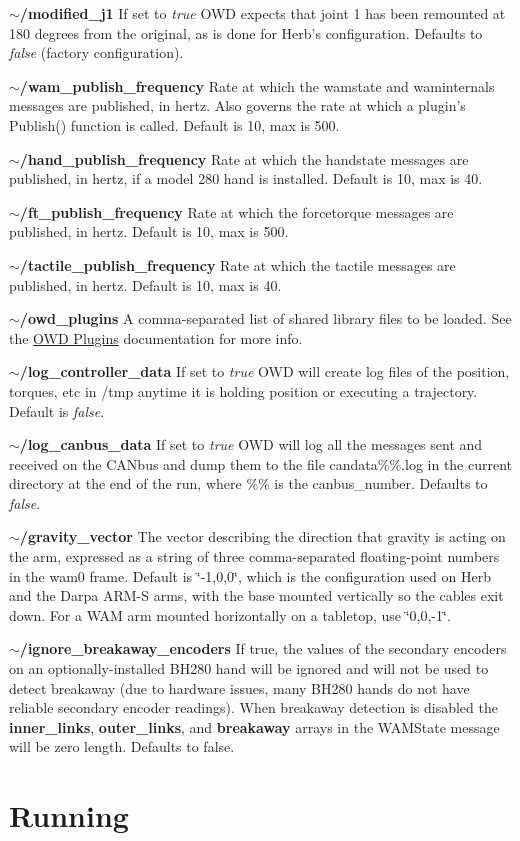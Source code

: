 \begin{DoxyItemize}
\item {\bfseries $\sim$/modified\-\_\-j1} If set to {\itshape true} O\-W\-D expects that joint 1 has been remounted at 180 degrees from the original, as is done for Herb's configuration. Defaults to {\itshape false} (factory configuration).
\item {\bfseries $\sim$/wam\-\_\-publish\-\_\-frequency} Rate at which the wamstate and waminternals messages are published, in hertz. Also governs the rate at which a plugin's Publish() function is called. Default is 10, max is 500.
\item {\bfseries $\sim$/hand\-\_\-publish\-\_\-frequency} Rate at which the handstate messages are published, in hertz, if a model 280 hand is installed. Default is 10, max is 40.
\item {\bfseries $\sim$/ft\-\_\-publish\-\_\-frequency} Rate at which the forcetorque messages are published, in hertz. Default is 10, max is 500.
\item {\bfseries $\sim$/tactile\-\_\-publish\-\_\-frequency} Rate at which the tactile messages are published, in hertz. Default is 10, max is 40.
\item {\bfseries $\sim$/owd\-\_\-plugins} A comma-\/separated list of shared library files to be loaded. See the \hyperlink{plugins}{O\-W\-D Plugins} documentation for more info.
\item {\bfseries $\sim$/log\-\_\-controller\-\_\-data} If set to {\itshape true} O\-W\-D will create log files of the position, torques, etc in /tmp anytime it is holding position or executing a trajectory. Default is {\itshape false}.
\item {\bfseries $\sim$/log\-\_\-canbus\-\_\-data} If set to {\itshape true} O\-W\-D will log all the messages sent and received on the C\-A\-Nbus and dump them to the file candata\%\%.log in the current directory at the end of the run, where \%\% is the canbus\-\_\-number. Defaults to {\itshape false}.
\item {\bfseries $\sim$/gravity\-\_\-vector} The vector describing the direction that gravity is acting on the arm, expressed as a string of three comma-\/separated floating-\/point numbers in the wam0 frame. Default is \char`\"{}-\/1,0,0\char`\"{}, which is the configuration used on Herb and the Darpa A\-R\-M-\/\-S arms, with the base mounted vertically so the cables exit down. For a W\-A\-M arm mounted horizontally on a tabletop, use \char`\"{}0,0,-\/1\char`\"{}.
\item {\bfseries $\sim$/ignore\-\_\-breakaway\-\_\-encoders} If true, the values of the secondary encoders on an optionally-\/installed B\-H280 hand will be ignored and will not be used to detect breakaway (due to hardware issues, many B\-H280 hands do not have reliable secondary encoder readings). When breakaway detection is disabled the {\bfseries inner\-\_\-links}, {\bfseries outer\-\_\-links}, and {\bfseries breakaway} arrays in the W\-A\-M\-State message will be zero length. Defaults to false.
\end{DoxyItemize}\hypertarget{index_running}{}\section{Running}\label{index_running}
